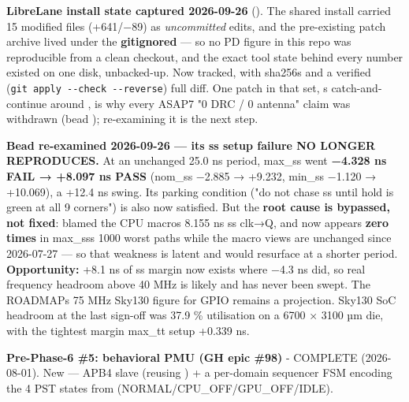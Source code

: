 \begin{record}
\textbf{LibreLane install state captured 2026-09-26}
(). The shared install carried 15 modified
files (+641/\allowbreak{}−89) as \emph{uncommitted} edits, and the
pre-existing patch archive lived under the \textbf{gitignored}
 --- so no PD figure in this repo was reproducible from a
clean checkout, and the exact tool state behind every number existed on
one disk, unbacked-up. Now tracked, with sha256s and a verified
(\texttt{git\ apply\ -\allowbreak{}-\allowbreak{}check\ -\allowbreak{}-\allowbreak{}reverse})
full diff. \warn{} One patch in that set,
\textquotesingle s catch-and-continue around
, is why every ASAP7 "0 DRC / 0 antenna" claim was
withdrawn (bead ); re-examining it is the next step.

\textbf{Bead  re-examined 2026-09-26 --- its ss setup failure
NO LONGER REPRODUCES.} At an unchanged 25.0 ns period, max\_ss went
\textbf{−4.328 ns FAIL → +8.097 ns PASS} (nom\_ss −2.885 → +9.232,
min\_ss −1.120 → +10.069), a +12.4 ns swing. Its parking condition ("do
not chase ss until hold is green at all 9 corners") is also now
satisfied. \warn{} But the \textbf{root cause is bypassed, not fixed}:
 blamed the CPU macro\textquotesingle s 8.155 ns ss clk→Q, and
 now appears \textbf{zero times} in
max\_ss\textquotesingle s 1000 worst paths while the macro views are
unchanged since 2026-07-27 --- so that weakness is latent and would
resurface at a shorter period. \textbf{Opportunity:} +8.1 ns of ss
margin now exists where −4.3 ns did, so real frequency headroom above 40
MHz is likely and has never been swept. The ROADMAP\textquotesingle s 75
MHz Sky130 figure for GPIO remains a projection. Sky130 SoC headroom at
the last sign-off was 37.9 \% utilisation on a 6700 × 3100 µm die, with
the tightest margin max\_tt setup +0.339 ns.

\textbf{Pre-Phase-6 \#5: behavioral PMU (GH epic \#98)} - \ok{} COMPLETE
(2026-08-01). New  --- APB4 slave (reusing
) + a per-domain sequencer FSM encoding the 4
PST states from 
(NORMAL/\allowbreak{}CPU\_\allowbreak{}OFF/\allowbreak{}GPU\_\allowbreak{}OFF/\allowbreak{}IDLE).


\end{record}
